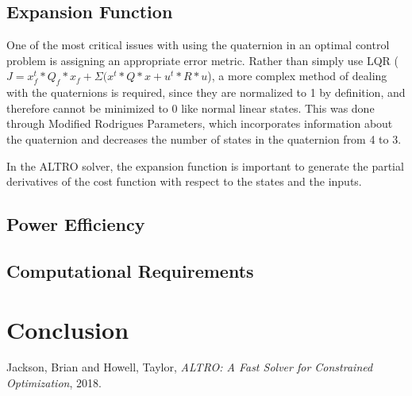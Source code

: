 \documentclass[10pt,notitlepage,twocolumn]{article}
\begin{document}
\subsection{Expansion Function}
One of the most critical issues with using the quaternion in an optimal control problem is assigning an appropriate error metric. Rather than simply use LQR ($J = x_f^t*Q_f*x_f + \Sigma(x^t*Q*x+u^t*R*u$), a more complex method of dealing with the quaternions is required, since they are normalized to 1 by definition, and therefore cannot be minimized to 0 like normal linear states. This was done through Modified Rodrigues Parameters\cite{MRP}, which incorporates information about the quaternion and decreases the number of states in the quaternion from 4 to 3. 

In the ALTRO solver, the expansion function is important to generate the partial derivatives of the cost function with respect to the states and the inputs.

\subsection{Power Efficiency}

\subsection{Computational Requirements}  

\section{Conclusion}

\begin{thebibliography}{1}

  Jackson, Brian and Howell, Taylor,
  \textit{ALTRO: A Fast Solver for Constrained Optimization},
  2018.

\end{thebibliography}
\end{document}
